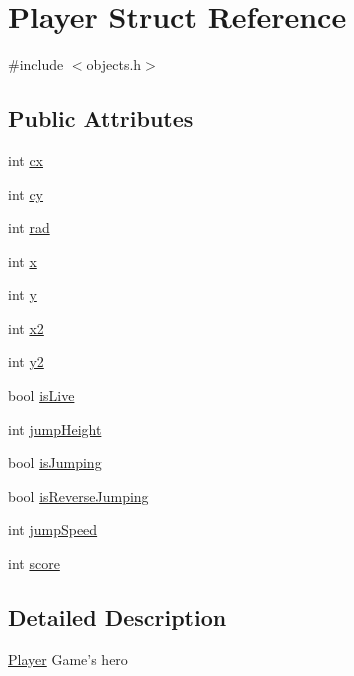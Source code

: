\hypertarget{struct_player}{\section{Player Struct Reference}
\label{struct_player}
}


{\ttfamily \#include $<$objects.\-h$>$}

\subsection*{Public Attributes}
\begin{DoxyCompactItemize}
\item 
int \hyperlink{struct_player_a10d006b3daa2e354476367ad931a2ac6}{cx}
\item 
int \hyperlink{struct_player_a61b687b371ad4b81827fd245b7e8f880}{cy}
\item 
int \hyperlink{struct_player_a46954cec62184c555fcdffc529952d92}{rad}
\item 
int \hyperlink{struct_player_ad285b3cb25e4a46ca944b9a416c1b13f}{x}
\item 
int \hyperlink{struct_player_a6da29d6e3783c6028c92647bbde478f5}{y}
\item 
int \hyperlink{struct_player_a1797ea6961b6f705f2e0c7244c73f755}{x2}
\item 
int \hyperlink{struct_player_a95e8a1142710c7760b2a1bd7cade9c5c}{y2}
\item 
bool \hyperlink{struct_player_ac37a8c409c969d9aa117c3ee25b8d523}{is\-Live}
\item 
int \hyperlink{struct_player_a23ee12d10a659932ebf917d1321ce49a}{jump\-Height}
\item 
bool \hyperlink{struct_player_aab294bec9f8fed91bb7d599e37bfd5f6}{is\-Jumping}
\item 
bool \hyperlink{struct_player_a71ca9f31cb654498da378f6db32b9eeb}{is\-Reverse\-Jumping}
\item 
int \hyperlink{struct_player_ae31361d3bdc51dac6d3211e399adab9c}{jump\-Speed}
\item 
int \hyperlink{struct_player_ace6abae8d66534ad0a1fd6458f786a6e}{score}
\end{DoxyCompactItemize}


\subsection{Detailed Description}
\hyperlink{struct_player}{Player} Game's hero 

